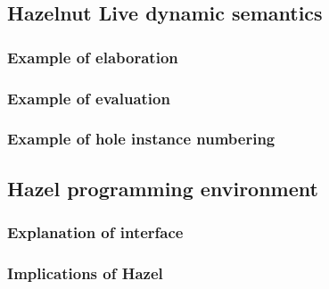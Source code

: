 \subsection{Hazelnut Live dynamic semantics}
\label{sec:dynamics}

\subsubsection{Example of elaboration}
\label{sec:elaboration_example}

\subsubsection{Example of evaluation}
\label{sec:evaluation_example}

\subsubsection{Example of hole instance numbering}
\label{sec:hole_instance_example}

\subsection{Hazel programming environment}
\label{sec:hazel_online}

\subsubsection{Explanation of interface}
\label{sec:hazel_interface}

\subsubsection{Implications of Hazel}
\label{sec:hazel_implications}

